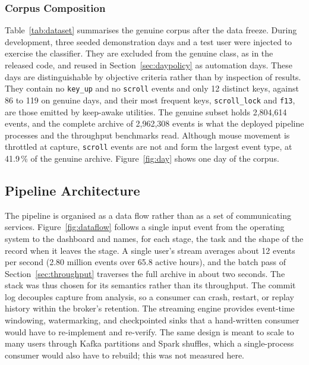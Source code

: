 \documentclass[sensors,article,submit,pdftex,oneauthor]{Definitions/mdpi}
\begin{document}
\subsubsection{Corpus Composition}
Table~\ref{tab:dataset} summarises the genuine corpus after the data freeze. During development, three seeded demonstration days and a test user were injected to exercise the classifier. They are excluded from the genuine class, as in the released code, and reused in Section~\ref{sec:daypolicy} as automation days. These days are distinguishable by objective criteria rather than by inspection of results. They contain no \texttt{key\_up} and no \texttt{scroll} events and only 12 distinct keys, against 86 to 119 on genuine days, and their most frequent keys, \texttt{scroll\_lock} and \texttt{f13}, are those emitted by keep-awake utilities. The genuine subset holds 2,804,614 events, and the complete archive of 2,962,308 events is what the deployed pipeline processes and the throughput benchmarks read. Although mouse movement is throttled at capture, \texttt{scroll} events are not and form the largest event type, at 41.9\,\% of the genuine archive. Figure~\ref{fig:day} shows one day of the corpus.





\subsection{Pipeline Architecture}
\label{sec:arch}

The pipeline is organised as a data flow rather than as a set of communicating services. Figure~\ref{fig:dataflow} follows a single input event from the operating system to the dashboard and names, for each stage, the task and the shape of the record when it leaves the stage. A single user's stream averages about 12 events per second (2.80 million events over 65.8 active hours), and the batch pass of Section~\ref{sec:throughput} traverses the full archive in about two seconds. The stack was thus chosen for its semantics rather than its throughput. The commit log decouples capture from analysis, so a consumer can crash, restart, or replay history within the broker's retention. The streaming engine provides event-time windowing, watermarking, and checkpointed sinks that a hand-written consumer would have to re-implement and re-verify. The same design is meant to scale to many users through Kafka partitions and Spark shuffles, which a single-process consumer would also have to rebuild; this was not measured here.
\end{document}
